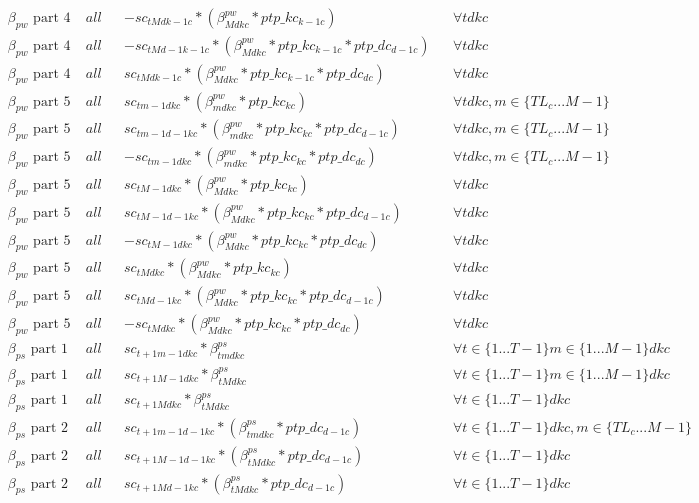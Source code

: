 \begin{equation}
\begin{alignedat}{10}
		& \beta_{pw} \text{ part 4 } && all && -sc_{tMdk-1c} * (\beta_{Mdkc}^{pw} * ptp\_kc_{k-1c}) && \forall tdkc \\
		& \beta_{pw} \text{ part 4 } && all && -sc_{tMd-1k-1c} * (\beta_{Mdkc}^{pw} * ptp\_kc_{k-1c} * ptp\_dc_{d-1c}) && \forall tdkc \\ 
		& \beta_{pw} \text{ part 4 } && all && sc_{tMdk-1c} * (\beta_{Mdkc}^{pw} * ptp\_kc_{k-1c} * ptp\_dc_{dc}) && \forall tdkc \\
		& \beta_{pw} \text{ part 5 } && all && sc_{tm-1dkc} * (\beta_{mdkc}^{pw} * ptp\_kc_{kc}) && \forall tdkc, m \in \{ TL_{c} ... M-1 \} \\
		& \beta_{pw} \text{ part 5 } && all && sc_{tm-1d-1kc} * (\beta_{mdkc}^{pw} * ptp\_kc_{kc} * ptp\_dc_{d-1c}) && \forall tdkc, m \in \{ TL_{c} ... M-1 \} \\ 
		& \beta_{pw} \text{ part 5 } && all && -sc_{tm-1dkc} * (\beta_{mdkc}^{pw} * ptp\_kc_{kc} * ptp\_dc_{dc}) && \forall tdkc, m \in \{ TL_{c} ... M-1 \} \\
		& \beta_{pw} \text{ part 5 } && all && sc_{tM-1dkc} * (\beta_{Mdkc}^{pw} * ptp\_kc_{kc}) && \forall tdkc \\
		& \beta_{pw} \text{ part 5 } && all && sc_{tM-1d-1kc} * (\beta_{Mdkc}^{pw} * ptp\_kc_{kc} * ptp\_dc_{d-1c}) && \forall tdkc \\ 
		& \beta_{pw} \text{ part 5 } && all && -sc_{tM-1dkc} * (\beta_{Mdkc}^{pw} * ptp\_kc_{kc} * ptp\_dc_{dc}) && \forall tdkc  \\
		& \beta_{pw} \text{ part 5 } && all && sc_{tMdkc} * (\beta_{Mdkc}^{pw} * ptp\_kc_{kc}) && \forall tdkc \\
		& \beta_{pw} \text{ part 5 } && all && sc_{tMd-1kc} * (\beta_{Mdkc}^{pw} * ptp\_kc_{kc} * ptp\_dc_{d-1c}) && \forall tdkc \\ 
		& \beta_{pw} \text{ part 5 } && all && -sc_{tMdkc} * (\beta_{Mdkc}^{pw} * ptp\_kc_{kc} * ptp\_dc_{dc}) && \forall tdkc \\
		& \beta_{ps} \text{ part 1 } && all && sc_{t+1m-1dkc} * \beta_{tmdkc}^{ps} && \forall t \in \{1...T-1 \} m \in \{ 1...M-1 \} dkc \\
		& \beta_{ps} \text{ part 1 } && all && sc_{t+1M-1dkc} * \beta_{tMdkc}^{ps} && \forall t \in \{1...T-1 \} m \in \{ 1...M-1 \} dkc \\
		& \beta_{ps} \text{ part 1 } && all && sc_{t+1Mdkc} * \beta_{tMdkc}^{ps} && \forall t \in \{1...T-1 \} dkc \\
		& \beta_{ps} \text{ part 2 } && all && sc_{t+1m-1d-1kc} * (\beta_{tmdkc}^{ps} * ptp\_dc_{d-1c}) && \forall t \in \{1...T-1 \} dkc, m \in \{TL_{c} ... M-1 \} \\
		& \beta_{ps} \text{ part 2 } && all && sc_{t+1M-1d-1kc} * (\beta_{tMdkc}^{ps} * ptp\_dc_{d-1c}) && \forall t \in \{1...T-1 \} dkc \\
		& \beta_{ps} \text{ part 2 } && all && sc_{t+1Md-1kc} * (\beta_{tMdkc}^{ps} * ptp\_dc_{d-1c}) && \forall t \in \{1...T-1 \} dkc \\ 
	\end{alignedat}
\end{equation}